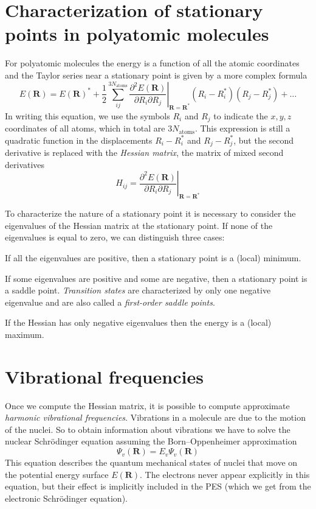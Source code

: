 \documentclass[../Main/notes.tex]{subfiles}
\begin{document}
\section{Characterization of stationary points in polyatomic molecules}

For polyatomic molecules the energy is a function of all the atomic coordinates and the Taylor series near a stationary point is given by a more complex formula
\begin{equation}
E(\mathbf{R}) =
E(\mathbf{R})^*
+\frac{1}{2}
\sum_{ij}^{3 N_\mathrm{atoms}} \left.\frac{\partial^2 E(\mathbf{R})}{\partial R_i \partial R_j}\right|_{\mathbf{R}=\mathbf{R}^*} (R_i - R_i^*) (R_j - R_j^*) + \ldots 
\end{equation}
In writing this equation, we use the symbols $R_i$ and $R_j$ to indicate the $x,y,z$ coordinates of all atoms, which in total are $3 N_\mathrm{atoms}$.
This expression is still a quadratic function in the displacements $R_i - R_i^*$ and $R_j - R_j^*$, but the second derivative is replaced with the \emph{Hessian matrix}, the matrix of mixed second derivatives
\begin{equation}
H_{ij} = 
\left.\frac{\partial^2 E(\mathbf{R})}{\partial R_i \partial R_j}\right|_{\mathbf{R}=\mathbf{R}^*}
\end{equation}

To characterize the nature of a stationary point it is necessary to consider the eigenvalues of the Hessian matrix at the stationary point.
If none of the eigenvalues is equal to zero, we can distinguish three cases:
\begin{myitems}
\item If all the eigenvalues are positive, then a stationary point is a (local) minimum.
\item If some eigenvalues are positive and some are negative, then a stationary point is a saddle point.
\emph{Transition states} are characterized by only one negative eigenvalue and are also called a \emph{first-order saddle points}.
\item If the Hessian has only negative eigenvalues then the energy is a (local) maximum.
\end{myitems}

\section{Vibrational frequencies}

Once we compute the Hessian matrix, it is possible to compute approximate \emph{harmonic vibrational frequencies}.
Vibrations in a molecule are due to the motion of the nuclei.
So to obtain information about vibrations we have to solve the nuclear Schr\"{o}dinger equation assuming the Born--Oppenheimer approximation
\begin{equation}
[\hat{T}_\mathrm{n} + E(\mathbf{R}) ] \Psi_v(\mathbf{R}) = E_v \Psi_v(\mathbf{R})
\end{equation}
This equation describes the quantum mechanical states of nuclei that move on the potential energy surface $E(\mathbf{R})$.
The electrons never appear explicitly in this equation, but their effect is implicitly included in the PES (which we get from the electronic Schr\"{o}dinger equation).
\end{document}
